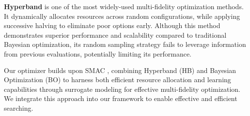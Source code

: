 \textbf{Hyperband} is one of the most widely-used multi-fidelity optimization \citep{peherstorfer2018survey} methods. It dynamically allocates resources across random configurations, while applying successive halving \citep{jamieson2016non} to eliminate poor options early. Although this method demonstrates superior performance and scalability compared to traditional Bayesian optimization, its random sampling strategy fails to leverage information from previous evaluations, potentially limiting its performance. 

Our optimizer builds upon SMAC \citep{JMLR:v23:21-0888}, combining Hyperband (HB) and Bayesian Optimization (BO) to harness both efficient resource allocation and learning capabilities through surrogate modeling for effective multi-fidelity optimization. We integrate this approach into our framework to enable effective and efficient searching.


